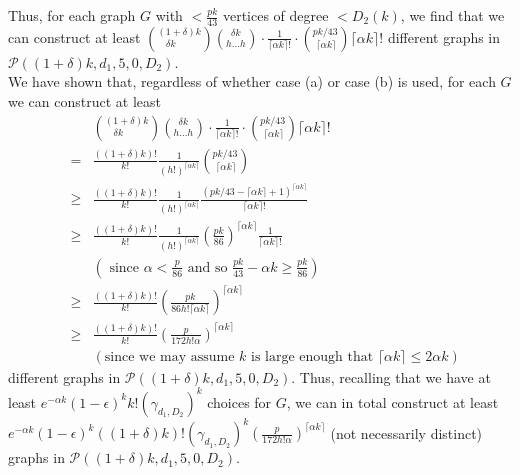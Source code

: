 \documentclass{article}
\newtheorem{Proof of Theorem}{Proof of Theorem}
\begin{document}
Thus, for each graph $G$ with $<\frac{pk}{43}$ vertices of degree $<D_{2}(k)$,
we find that we can construct at least
$
\left(^{(1+\delta)k} _{\phantom{qq} \delta k} \right)
\left(^{\phantom{p}\delta k}_{h \ldots h} \right) 
\cdot \frac{1}{\lceil \alpha k \rceil !} \cdot \left( ^{pk/43}_{\phantom{i} \lceil \alpha k \rceil} \right)
\lceil \alpha k \rceil !
$
different graphs in $\mathcal{P}((1+\delta)k,d_{1},5,0,D_{2})$. \\

We have shown that,
regardless of whether case (a) or case (b) is used,
for each $G$ we can construct at least 
\begin{eqnarray*}
& & \left(^{(1+\delta)k} _{\phantom{qq} \delta k} \right)
\left(^{\phantom{p}\delta k}_{h \ldots h} \right) 
\cdot \frac{1}{\lceil \alpha k \rceil !} \cdot \left( ^{pk/43}_{\phantom{i} \lceil \alpha k \rceil} \right)
\lceil \alpha k \rceil ! \\
& = & \frac{((1+\delta)k)!}{k!} \frac{1}{(h!)^{\lceil \alpha k \rceil}} 
\left(^{pk/43}_{\phantom{i} \lceil \alpha k \rceil} \right) \\
& \geq & \frac{((1+\delta)k)!}{k!} \frac{1}{(h!)^{\lceil \alpha k \rceil}}
\frac{(pk/43 - \lceil \alpha k \rceil +1)^{\lceil \alpha k \rceil}}{\lceil \alpha k \rceil !} \\
& \geq & \frac{((1+\delta)k)!}{k!} \frac{1}{(h!)^{\lceil \alpha k \rceil}} 
\left( \frac{pk}{86} \right)^{\lceil \alpha k \rceil} \frac{1}{\lceil \alpha k \rceil !} \\
& & \left( \textrm{ since } \alpha < \frac{p}{86}
\textrm{ and so } \frac{pk}{43} - \alpha k \geq \frac{pk}{86} \right) \\
& \geq & \frac{((1+\delta)k)!}{k!} \left( \frac{pk}{86h! \lceil \alpha k \rceil} \right)^{\lceil \alpha k \rceil} \\
& \geq & \frac{((1+\delta)k)!}{k!} \left( \frac{p}{172h! \alpha} \right)^{\lceil \alpha k \rceil} \\
& & \left( \textrm{since we may assume $k$ is large enough that } 
\lceil \alpha k \rceil \leq 2 \alpha k \right)
\end{eqnarray*}
different graphs in $\mathcal{P}((1+\delta)k,d_{1},5,0,D_{2})$.
Thus, recalling that we have at least
$e^{-\alpha k} (1-\epsilon)^{k}k! \left( \gamma_{d_{1},D_{2}} \right)^{k}$
choices for $G$,
we can in total construct at least
$
e^{-\alpha k} (1-\epsilon)^{k} ((1+\delta)k)! \left( \gamma_{d_{1},D_{2}} \right)^{k}
\left( \frac{p}{172h! \alpha} \right)^{\lceil \alpha k \rceil}
$
(not necessarily distinct) graphs in $\mathcal{P}((1+\delta)k,d_{1},5,0,D_{2})$. \\
\\
\end{document}
